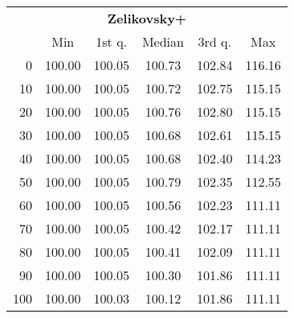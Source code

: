 \begin{tabular}{r|ccccc}
  \multicolumn{6}{c}{{\bf Zelikovsky+}} \\
  & Min & 1st q. & Median & 3rd q. & Max \\ \hline\hline
  0 & 100.00 & 100.05 & 100.73 & 102.84 & 116.16
\\ 10 & 100.00 & 100.05 & 100.72 & 102.75 & 115.15
\\ 20 & 100.00 & 100.05 & 100.76 & 102.80 & 115.15
\\ 30 & 100.00 & 100.05 & 100.68 & 102.61 & 115.15
\\ 40 & 100.00 & 100.05 & 100.68 & 102.40 & 114.23
\\ 50 & 100.00 & 100.05 & 100.79 & 102.35 & 112.55
\\ 60 & 100.00 & 100.05 & 100.56 & 102.23 & 111.11
\\ 70 & 100.00 & 100.05 & 100.42 & 102.17 & 111.11
\\ 80 & 100.00 & 100.05 & 100.41 & 102.09 & 111.11
\\ 90 & 100.00 & 100.05 & 100.30 & 101.86 & 111.11
\\ 100 & 100.00 & 100.03 & 100.12 & 101.86 & 111.11
\end{tabular}
